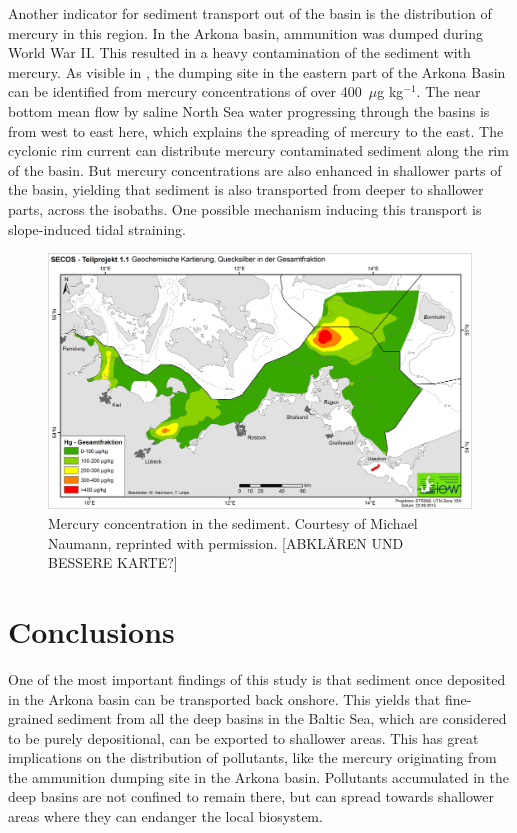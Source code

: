 Another indicator for sediment transport out of the basin is the distribution 
of mercury in this region. In the Arkona basin, ammunition was dumped during 
World War II. This resulted in a heavy contamination of the sediment with 
mercury. As visible in , the dumping site in the eastern part of the 
Arkona Basin can be identified from mercury concentrations of over 400~$\mu$g 
kg$^{-1}$. The near bottom mean flow by saline North Sea water progressing 
through the basins is from west to east here, which explains the spreading of 
mercury to the east. The cyclonic rim current can distribute mercury 
contaminated sediment along the rim of the basin. But mercury concentrations 
are also enhanced in shallower parts of the basin, yielding that sediment is 
also transported from deeper to shallower parts, across the isobaths. One 
possible mechanism inducing this transport is slope-induced tidal straining.
   \begin{figure}[ht]
\includegraphics[width=15cm]{bilder/HG_GF.jpg}
 \caption{Mercury concentration in the sediment. Courtesy of Michael Naumann, 
reprinted with permission. [ABKLÄREN UND BESSERE KARTE?]}
 \label{hg}
 \end{figure}
 
\section{Conclusions}

One of the most important findings of this study is that sediment once 
deposited in the Arkona basin can be transported back onshore. 
This yields that fine-grained sediment from all the deep basins in the Baltic 
Sea, which are considered to be purely depositional, can be exported to 
shallower areas. This has great implications on the distribution of pollutants, 
like the mercury originating from the ammunition dumping site in the Arkona 
basin. Pollutants accumulated in the deep basins are not confined to remain 
there, but can spread towards shallower areas where they can endanger the local 
biosystem.

